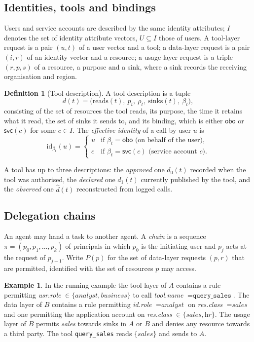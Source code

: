 \documentclass[preprint,12pt]{elsarticle}
\theoremstyle{definition}
\newtheorem{definition}{Definition}
\newtheorem{example}{Example}
\theoremstyle{remark}
\newcommand{\obo}{\mathsf{obo}}
\newcommand{\svc}{\mathsf{svc}}
\newcommand{\reads}{\mathrm{reads}}
\newcommand{\sinks}{\mathrm{sinks}}
\newcommand{\ident}{\mathrm{id}}
\begin{document}
\subsection{Identities, tools and bindings}
Users and service accounts are described by the same identity attributes; $I$ denotes the set of identity attribute vectors, $U \subseteq I$ those of users. A tool-layer request is a pair $(u, t)$ of a user vector and a tool; a data-layer request is a pair $(i, r)$ of an identity vector and a resource; a usage-layer request is a triple $(r, p, s)$ of a resource, a purpose and a sink, where a sink records the receiving organisation and region.

\begin{definition}[Tool description]\label{def:tool}
A tool description is a tuple
\[
d(t) = \bigl(\reads(t),\ p_t,\ \rho_t,\ \sinks(t),\ \beta_t\bigr),
\]
consisting of the set of resources the tool reads, its purpose, the time it retains what it read, the set of sinks it sends to, and its binding, which is either $\obo$ or $\svc(c)$ for some $c \in I$. The \emph{effective identity} of a call by user $u$ is
\[
\ident_{\beta_t}(u) = \begin{cases} u & \text{if } \beta_t = \obo \text{ (on behalf of the user)},\\ c & \text{if } \beta_t = \svc(c) \text{ (service account } c\text{)}. \end{cases}
\]
\end{definition}
A tool has up to three descriptions: the \emph{approved} one $d_0(t)$ recorded when the tool was authorised, the \emph{declared} one $d_1(t)$ currently published by the tool, and the \emph{observed} one $\hat d(t)$ reconstructed from logged calls.

\subsection{Delegation chains}
An agent may hand a task to another agent. A \emph{chain} is a sequence $\pi = (p_0, p_1, \dots, p_k)$ of principals in which $p_0$ is the initiating user and $p_j$ acts at the request of $p_{j-1}$. Write $P(p)$ for the set of data-layer requests $(p, r)$ that are permitted, identified with the set of resources $p$ may access.

\begin{example}\label{ex:model}
In the running example the tool layer of $A$ contains a rule permitting \textit{usr.role} $\in \{\textit{analyst}, \textit{business}\}$ to call \textit{tool.name} $= \texttt{query\_sales}$. The data layer of $B$ contains a rule permitting \textit{id.role} $= \textit{analyst}$ on \textit{res.class} $= \textit{sales}$ and one permitting the application account on \textit{res.class} $\in \{\textit{sales}, \textit{hr}\}$. The usage layer of $B$ permits \textit{sales} towards sinks in $A$ or $B$ and denies any resource towards a third party. The tool \texttt{query\_sales} reads $\{\textit{sales}\}$ and sends to $A$.
\end{example}
\end{document}
